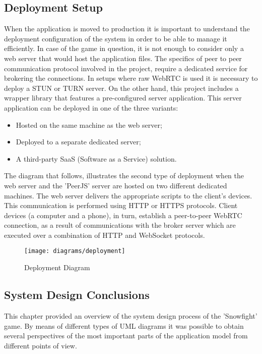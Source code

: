 \newpage

\subsection{Deployment Setup}

When the application is moved to production it is important to understand the
deployment configuration of the system in order to be able to manage it
efficiently. In case of the game in question, it is not enough to consider only
a web server that would host the application files. The specifics of peer to
peer communication protocol involved in the project, require a dedicated service
for brokering the connections. In setups where raw WebRTC is used it is
necessary to deploy a STUN or TURN server. On the other hand, this project
includes a wrapper library that features a pre-configured server application.
This server application can be deployed in one of the three variants:

\begin{itemize}
	\item Hosted on the same machine as the web server;
	\item Deployed to a separate dedicated server;
	\item A third-party SaaS (Software as a Service) solution.
\end{itemize}

The diagram that follows, illustrates the second type of deployment when the web
server and the 'PeerJS' server are hosted on two different dedicated machines.
The web server delivers the appropriate scripts to the client's devices. This
communication is performed using HTTP or HTTPS protocols. Client devices (a
computer and a phone), in turn, establish a peer-to-peer WebRTC connection, as a
result of communications with the broker server which are executed over a
combination of HTTP and WebSocket protocols.

\begin{figure}[!h]
\centering
\texttt{[image: diagrams/deployment]}
\caption{Deployment Diagram}\label{diag:deployment}
\end{figure}

\newpage

\subsection{System Design Conclusions}

This chapter provided an overview of the system design process of the
'Snowfight' game. By means of different types of UML diagrams it was possible to
obtain several perspectives of the most important parts of the application model
from different points of view.

